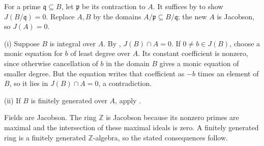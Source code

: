 For a prime $\mathfrak{q}\subseteq B$, let $\mathfrak{p}$ be its contraction to $A$. It suffices by  to show $J(B/\mathfrak{q})=0$. Replace $A,B$ by the domains $A/\mathfrak{p}\subseteq B/\mathfrak{q}$; the new $A$ is Jacobson, so $J(A)=0$.

(i) Suppose $B$ is integral over $A$. By , $J(B)\cap A=0$. If $0\neq b\in J(B)$, choose a monic equation for $b$ of least degree over $A$. Its constant coefficient is nonzero, since otherwise cancellation of $b$ in the domain $B$ gives a monic equation of smaller degree. But the equation writes that coefficient as $-b$ times an element of $B$, so it lies in $J(B)\cap A=0$, a contradiction.

(ii) If $B$ is finitely generated over $A$, apply .

Fields are Jacobson. The ring $\mathbb{Z}$ is Jacobson because its nonzero primes are maximal and the intersection of these maximal ideals is zero. A finitely generated ring is a finitely generated $\mathbb{Z}$-algebra, so the stated consequences follow.
